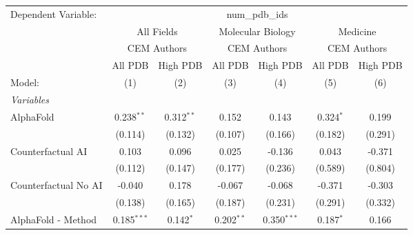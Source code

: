 \begingroup
\centering
\begin{tabular}{lcccccc}
   \tabularnewline \midrule \midrule
   Dependent Variable: & \multicolumn{6}{c}{num\_pdb\_ids}\\
 & \multicolumn{2}{c}{All Fields} & \multicolumn{2}{c}{Molecular Biology} & \multicolumn{2}{c}{Medicine} \\
\cmidrule(lr){2-3} \cmidrule(lr){4-5} \cmidrule(lr){6-7}
 & \multicolumn{2}{c}{CEM Authors} & \multicolumn{2}{c}{CEM Authors} & \multicolumn{2}{c}{CEM Authors} \\
\cmidrule(lr){2-3} \cmidrule(lr){4-5} \cmidrule(lr){6-7}
 & \multicolumn{1}{c}{All PDB} & \multicolumn{1}{c}{High PDB} & \multicolumn{1}{c}{All PDB} & \multicolumn{1}{c}{High PDB} & \multicolumn{1}{c}{All PDB} & \multicolumn{1}{c}{High PDB} \\
\cmidrule(lr){2-2} \cmidrule(lr){3-3} \cmidrule(lr){4-4} \cmidrule(lr){5-5} \cmidrule(lr){6-6} \cmidrule(lr){7-7}
   Model:                                                     & (1)            & (2)            & (3)            & (4)           & (5)           & (6)\\  
   \midrule
   \emph{Variables}\\
   AlphaFold                                                  & 0.238$^{**}$   & 0.312$^{**}$   & 0.152          & 0.143         & 0.324$^{*}$   & 0.199\\   
                                                              & (0.114)        & (0.132)        & (0.107)        & (0.166)       & (0.182)       & (0.291)\\   
   Counterfactual AI                                          & 0.103          & 0.096          & 0.025          & -0.136        & 0.043         & -0.371\\   
                                                              & (0.112)        & (0.147)        & (0.177)        & (0.236)       & (0.589)       & (0.804)\\   
   Counterfactual No AI                                       & -0.040         & 0.178          & -0.067         & -0.068        & -0.371        & -0.303\\   
                                                              & (0.138)        & (0.165)        & (0.187)        & (0.231)       & (0.291)       & (0.332)\\   
   AlphaFold - Method                                         & 0.185$^{***}$  & 0.142$^{*}$    & 0.202$^{**}$   & 0.350$^{***}$ & 0.187$^{*}$   & 0.166\\   

\end{tabular}
